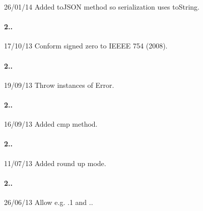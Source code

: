 \begin{DoxyItemize}
\item 26/01/14 Added {\ttfamily to\+J\+S\+ON} method so serialization uses {\ttfamily to\+String}.
\end{DoxyItemize}

\paragraph*{2..}


\begin{DoxyItemize}
\item 17/10/13 Conform signed zero to I\+E\+E\+EE 754 (2008).
\end{DoxyItemize}

\paragraph*{2..}


\begin{DoxyItemize}
\item 19/09/13 Throw instances of {\ttfamily Error}.
\end{DoxyItemize}

\paragraph*{2..}


\begin{DoxyItemize}
\item 16/09/13 Added {\ttfamily cmp} method.
\end{DoxyItemize}

\paragraph*{2..}


\begin{DoxyItemize}
\item 11/07/13 Added \textquotesingle{}round up\textquotesingle{} mode.
\end{DoxyItemize}

\paragraph*{2..}


\begin{DoxyItemize}
\item 26/06/13 Allow e.\+g. {\ttfamily .1} and {.}.
\end{DoxyItemize}


